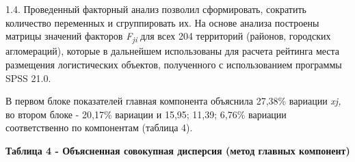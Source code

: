 
1.4. Проведенный факторный анализ позволил сформировать, сократить
количество переменных и сгруппировать их. На основе анализа построены
матрицы значений факторов \emph{F\textsubscript{ji}} для всех 204
территорий (районов, городских агломераций), которые в дальнейшем
использованы для расчета рейтинга места размещения логистических
объектов, полученного с использованием программы SPSS 21.0.

В первом блоке показателей главная компонента объяснила 27,38\% вариации
\emph{xj,} во втором блоке - 20,17\% вариации и 15,95; 11,39; 6,76\%
вариации соответственно по компонентам (таблица 4).

{\bfseries Таблица 4 - Объясненная совокупная дисперсия (метод главных
компонент)}

